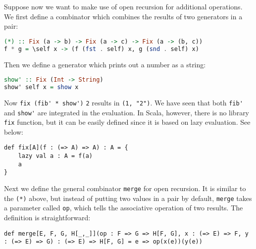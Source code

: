 Suppose now we want to make use of open recursion for additional operations. We first define a combinator which combines the results of two generators in a pair:
\begin{lstlisting}[language=Haskell,keywords={}]
(*) :: Fix (a -> b) -> Fix (a -> c) -> Fix (a -> (b, c))
f * g = \self x -> (f (fst . self) x, g (snd . self) x)
\end{lstlisting}
Then we define a generator which prints out a number as a string:
\begin{lstlisting}[language=Haskell,keywords={}]
show' :: Fix (Int -> String)
show' self x = show x
\end{lstlisting}
Now \lstinline{fix (fib'}\lstinline{ * show')} \lstinline{2} results in \lstinline{(1, "2")}. We have seen that both \lstinline{fib'} and \lstinline{show'} are integrated in the evaluation. In Scala, however, there is no library \lstinline{fix} function, but it can be easily defined since it is based on lazy evaluation. See below:
\begin{lstlisting}
def fix[A](f : (=> A) => A) : A = {
    lazy val a : A = f(a)
    a
}
\end{lstlisting}
Next we define the general combinator \lstinline{merge} for open recursion. It is similar to the \lstinline{(*)} above, but instead of putting two values in a pair by default, \lstinline{merge} takes a parameter called \lstinline{op}, which tells the associative operation of two results. The definition is straightforward:
\begin{lstlisting}
def merge[E, F, G, H[_,_]](op : F => G => H[F, G], x : (=> E) => F, y : (=> E) => G) : (=> E) => H[F, G] = e => op(x(e))(y(e))
\end{lstlisting}
